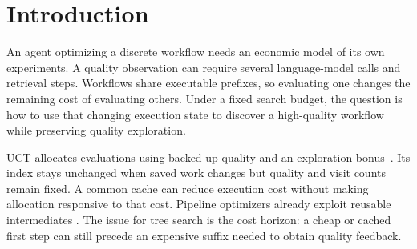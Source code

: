 \begin{abstract}
Evaluating a workflow produces quality information and reusable execution
state, changing the cost of later evaluations. AgentUCT adds an economic
model of execution to UCT: saved prefixes, observed bills and continuation
demand estimate the remaining cost of obtaining a complete quality observation.
That price guides allocation while raw quality is backed up. We characterize
the execution information sufficient for exact completion pricing and prove
logarithmic cumulative training-quality regret on finite trees with fixed
scores, bounded cold prices and persistent successful execution.
In a shared HotpotQA RAG system, AgentUCT achieves $69.57\pm0.28\%$ test F1
at a 32M weighted-token search budget, compared with $68.01\pm1.12\%$ for
MCTS-UCT over five paired seeds. The advantage persists when the training-best
workflow is tested without validation. AgentUCT has the highest 32M mean
among eleven methods in this protocol, with seed-level and smaller-budget
exceptions. On GSM8K, its largest-budget mean is slightly higher than MCTS-UCT
and equal to AFlow. Completion pricing improves allocation in the tested
RAG regime; neither the theory nor the generated-workflow results establish
universal finite-budget superiority.
\end{abstract}
\ifdefined\AgentUCTAAMAS
\maketitle
\fi

\section{Introduction}
An agent optimizing a discrete workflow needs an economic model of its own
experiments. A quality observation can require several language-model calls
and retrieval steps. Workflows share executable prefixes, so evaluating one
changes the remaining cost of evaluating others. Under a fixed search budget,
the question is how to use that changing execution state to discover a
high-quality workflow while preserving quality exploration.

UCT allocates evaluations using backed-up quality and an exploration
bonus~\citep{kocsis2006bandit}. Its index stays unchanged when saved work
changes but quality and visit counts remain fixed. A common cache can reduce
execution cost without making allocation responsive to that cost.
Pipeline optimizers already exploit reusable intermediates
\citep{zhang2016flash,essofi2024memoization,torresi2026multistage}.
The issue for tree search is the cost horizon: a cheap or cached first step
can still precede an expensive suffix needed to obtain quality feedback.

